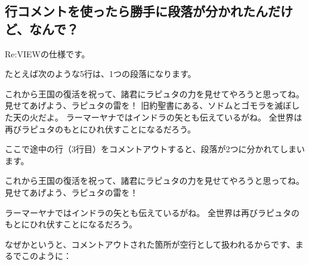 \subsection{行コメントを使ったら勝手に段落が分かれたんだけど、なんで？}
\label{sec:2-1-2}

Re:VIEWの仕様です。

たとえば次のような5行は、1つの段落になります。

\begin{starterprogram}\end{starterprogram}
\noindent
{}

\starterresult

これから王国の復活を祝って、諸君にラピュタの力を見せてやろうと思ってね。
見せてあげよう、ラピュタの雷を！
旧約聖書にある、ソドムとゴモラを滅ぼした天の火だよ。
ラーマーヤナではインドラの矢とも伝えているがね。
全世界は再びラピュタのもとにひれ伏すことになるだろう。

\endstarterresult

ここで途中の行（3行目）をコメントアウトすると、段落が2つに分かれてしまいます。

\begin{starterprogram}\end{starterprogram}
\noindent
{}

\starterresult

これから王国の復活を祝って、諸君にラピュタの力を見せてやろうと思ってね。
見せてあげよう、ラピュタの雷を！

ラーマーヤナではインドラの矢とも伝えているがね。
全世界は再びラピュタのもとにひれ伏すことになるだろう。

\endstarterresult

なぜかというと、コメントアウトされた箇所が空行として扱われるからです、まるでこのように：

\begin{starterprogram}\end{starterprogram}

